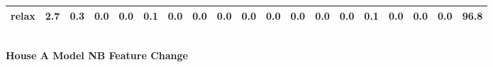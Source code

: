 \documentclass{article}
\begin{document}
\begin{sideways}
\begin{tabular}{lrrrrrrrrrrrrrrrrrr}
relax                         &         2.7 &                0.3 &           0.0 &                          0.0 &                0.1 &                0.0 &                        0.0 &          0.0 &              0.0 &                0.0 &                    0.0 &                      0.0 &                  0.0 &                   0.1 &              0.0 &              0.0 &                                  0.0 &         96.8 \\
\bottomrule
\end{tabular}
\end{sideways}
\normalsize
\vspace{1cm}\\
\textbf{House A Model NB Feature Change}\\
\vspace{1cm}\\
\end{document}
